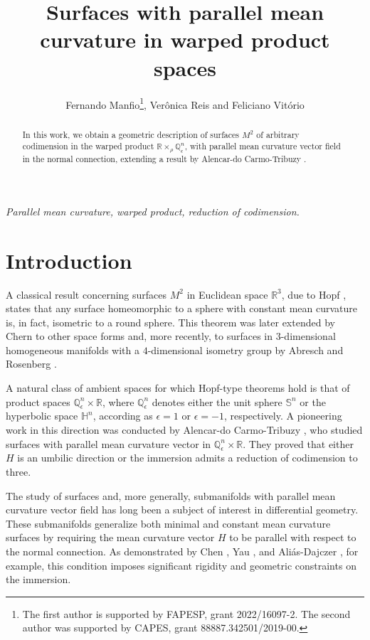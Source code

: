 \documentclass[11pt,a4paper]{article}
\title{Surfaces with parallel mean curvature in warped product spaces}
\author{Fernando Manfio\footnote{The first author is supported by FAPESP, grant 2022/16097-2. The second author was supported by CAPES, grant 88887.342501/2019-00.}, Verônica Reis and Feliciano Vitório}
\date{}
\numberwithin{equation}{section}
\newcommand{\R}{\mathbb{R}}
\newcommand{\Sp}{\mathbb{S}}
\newcommand{\Hy}{\mathbb{H}}
\newcommand{\Q}{\mathbb{Q}}
\newcommand{\e}{\epsilon}
\begin{document}
	

\maketitle

\begin{abstract}
In this work, we obtain a geometric description of surfaces $M^2$ of arbitrary codimension in the warped product $\R\times_\rho\Q^n_\e$, with parallel mean curvature vector field in the normal connection, extending a result by Alencar-do Carmo-Tribuzy \cite{AlCaTr}.
\end{abstract}
	

 {\small {\em Parallel mean curvature, warped product, reduction of codimension.}}


\section{Introduction}

A classical result concerning surfaces $M^2$ in Euclidean space $\mathbb{R}^3$, due to Hopf \cite{Ho}, states that any surface homeomorphic to a sphere with constant mean curvature is, in fact, isometric to a round sphere. This theorem was later extended by Chern \cite{Ch} to other space forms and, more recently, to surfaces in $3$-dimensional homogeneous manifolds with a $4$-dimensional isometry group by Abresch and Rosenberg \cite{AbRo}.

A natural class of ambient spaces for which Hopf-type theorems hold is that of product spaces $\Q^n_\e\times\R$, where $\Q^n_\e$ denotes either the unit sphere $\Sp^n$ or the hyperbolic space $\Hy^n$, according as $\e=1$ or $\e=-1$, respectively. A pioneering work in this direction was conducted by Alencar-do Carmo-Tribuzy \cite{AlCaTr}, who studied surfaces with parallel mean curvature vector in $\Q^n_\e\times\R$. They proved that either $H$ is an umbilic direction or the immersion admits a reduction of codimension to three.  

The study of surfaces and, more generally, submanifolds with parallel mean curvature vector field has long been a subject of interest in differential geometry. These submanifolds generalize both minimal and constant mean curvature surfaces by requiring the mean curvature vector $H$ to be parallel with respect to the normal connection. As demonstrated by Chen \cite{Chen}, Yau \cite{Yau}, and Aliás-Dajczer \cite{AlDa}, for example, this condition imposes significant rigidity and geometric constraints on the immersion.
\end{document}
